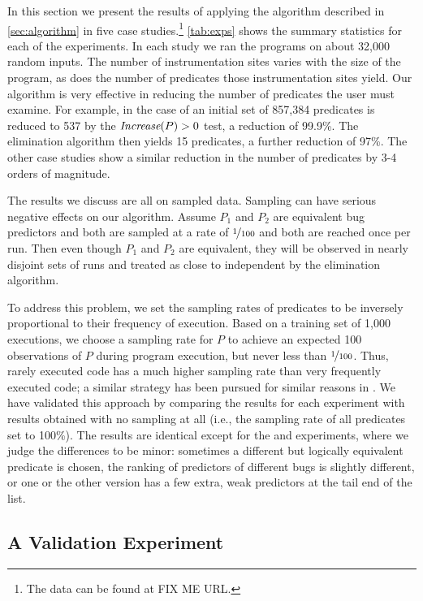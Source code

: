 


In this section we present the results of applying the algorithm
described in \autoref{sec:algorithm} in five case studies.\footnote{
The data can be found at FIX ME URL.}
\autoref{tab:exps} shows the summary statistics for each of the
experiments.  In each study we ran the programs on about 32,000 random
inputs.  The number of instrumentation sites varies with the size of
the program, as does the number of predicates those instrumentation
sites yield.  Our algorithm is very effective in reducing the number
of predicates the user must examine.  For example, in the case of
\rhythmbox an initial set of 857,384 predicates is reduced to 537 by the $\textit{Increase}(P) > 0$
test, a reduction of 99.9\%.  The elimination algorithm then yields 15 predicates, a further
reduction of 97\%.  The other case studies show a similar reduction in the number of
predicates by 3-4 orders of magnitude.

The results we discuss are all on sampled data.  Sampling can have
serious negative effects on our algorithm.  Assume $P_1$ and $P_2$ are
equivalent bug predictors and both are sampled at a rate of
$\nicefrac{1}{100}$ and both are reached once per run.  Then even though
$P_1$ and $P_2$ are equivalent, they will be observed in nearly disjoint
sets of runs and treated as close to independent by the elimination
algorithm.

To address this problem, we set the sampling rates of predicates to be
inversely proportional to their frequency of execution.  Based on a
training set of 1,000 executions, we choose a sampling rate for $P$ to
achieve an expected 100 observations of $P$ during program execution,
but never less than $\nicefrac{1}{100}$.  Thus, rarely executed code has a
much higher sampling rate than very frequently executed code; a
similar strategy has been pursued for similar reasons in \cite{chil04}.  We
have validated this approach by comparing the results for each
experiment with results obtained with no sampling at all (i.e., the
sampling rate of all predicates set to 100\%).  The results are
identical except for the \rhythmbox and \moss experiments, where we
judge the differences to be minor: sometimes a different but logically
equivalent predicate is chosen, the ranking of predictors of different
bugs is slightly different, or one or the other version has a few
extra, weak predictors at the tail end of the list.  


\subsection{A Validation Experiment}

